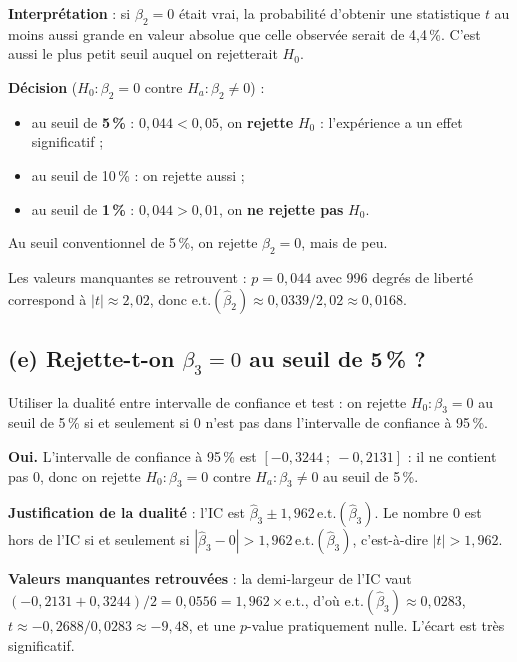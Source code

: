 \documentclass[11pt,a4paper]{article}
\begin{document}
\begin{reponse}
\textbf{Interprétation} : si $\beta_2=0$ était vrai, la probabilité d'obtenir une statistique $t$ au moins aussi grande en valeur absolue que celle observée serait de 4,4\,\%. C'est aussi le plus petit seuil auquel on rejetterait $H_0$.

\textbf{Décision} ($H_0:\beta_2=0$ contre $H_a:\beta_2\neq0$) :
\begin{itemize}[nosep]
\item au seuil de \textbf{5\,\%} : $0{,}044<0{,}05$, on \textbf{rejette} $H_0$ : l'expérience a un effet significatif ;
\item au seuil de 10\,\% : on rejette aussi ;
\item au seuil de \textbf{1\,\%} : $0{,}044>0{,}01$, on \textbf{ne rejette pas} $H_0$.
\end{itemize}
Au seuil conventionnel de 5\,\%, on rejette $\beta_2=0$, mais de peu.

Les valeurs manquantes se retrouvent : $p=0{,}044$ avec 996 degrés de liberté correspond à $|t|\approx2{,}02$, donc $\text{e.t.}(\hat\beta_2)\approx0{,}0339/2{,}02\approx0{,}0168$.
\end{reponse}

\subsection*{(e) Rejette-t-on $\beta_3=0$ au seuil de 5\,\% ?}

\begin{idee}
Utiliser la dualité entre intervalle de confiance et test : on rejette $H_0:\beta_3=0$ au seuil de 5\,\% si et seulement si 0 n'est pas dans l'intervalle de confiance à 95\,\%.
\end{idee}

\begin{reponse}
\textbf{Oui.} L'intervalle de confiance à 95\,\% est $[-0{,}3244\ ;\ -0{,}2131]$ : il ne contient pas 0, donc on rejette $H_0:\beta_3=0$ contre $H_a:\beta_3\neq0$ au seuil de 5\,\%.

\textbf{Justification de la dualité} : l'IC est $\hat\beta_3\pm1{,}962\,\text{e.t.}(\hat\beta_3)$. Le nombre 0 est hors de l'IC si et seulement si $|\hat\beta_3-0|>1{,}962\,\text{e.t.}(\hat\beta_3)$, c'est-à-dire $|t|>1{,}962$.

\textbf{Valeurs manquantes retrouvées} : la demi-largeur de l'IC vaut $(-0{,}2131+0{,}3244)/2=0{,}0556=1{,}962\times\text{e.t.}$, d'où $\text{e.t.}(\hat\beta_3)\approx0{,}0283$, $t\approx-0{,}2688/0{,}0283\approx-9{,}48$, et une $p$-value pratiquement nulle. L'écart est très significatif.
\end{reponse}
\end{document}
